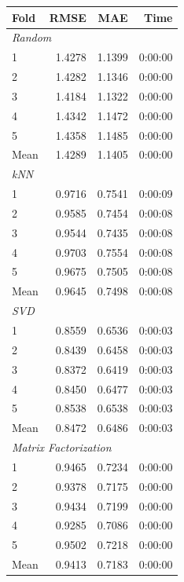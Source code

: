 {\small
\renewcommand{\arraystretch}{0.85}
\setlength{\tabcolsep}{4pt}
\begin{table}[H]
  \centering
  \begin{tabular}{lrrr}
    \hline
    \textbf{Fold} & \textbf{RMSE} & \textbf{MAE} & \textbf{Time} \\
    \hline
    \multicolumn{4}{l}{\textit{Random}} \\
    1    & 1.4278 & 1.1399 & 0:00:00 \\
    2    & 1.4282 & 1.1346 & 0:00:00 \\
    3    & 1.4184 & 1.1322 & 0:00:00 \\
    4    & 1.4342 & 1.1472 & 0:00:00 \\
    5    & 1.4358 & 1.1485 & 0:00:00 \\
    Mean & 1.4289 & 1.1405 & 0:00:00 \\
    \hline
    \multicolumn{4}{l}{\textit{kNN}} \\
    1    & 0.9716 & 0.7541 & 0:00:09 \\
    2    & 0.9585 & 0.7454 & 0:00:08 \\
    3    & 0.9544 & 0.7435 & 0:00:08 \\
    4    & 0.9703 & 0.7554 & 0:00:08 \\
    5    & 0.9675 & 0.7505 & 0:00:08 \\
    Mean & 0.9645 & 0.7498 & 0:00:08 \\
    \hline
    \multicolumn{4}{l}{\textit{SVD}} \\
    1    & 0.8559 & 0.6536 & 0:00:03 \\
    2    & 0.8439 & 0.6458 & 0:00:03 \\
    3    & 0.8372 & 0.6419 & 0:00:03 \\
    4    & 0.8450 & 0.6477 & 0:00:03 \\
    5    & 0.8538 & 0.6538 & 0:00:03 \\
    Mean & 0.8472 & 0.6486 & 0:00:03 \\
    \hline
    \multicolumn{4}{l}{\textit{Matrix Factorization}} \\
    1    & 0.9465 & 0.7234 & 0:00:00 \\
    2    & 0.9378 & 0.7175 & 0:00:00 \\
    3    & 0.9434 & 0.7199 & 0:00:00 \\
    4    & 0.9285 & 0.7086 & 0:00:00 \\
    5    & 0.9502 & 0.7218 & 0:00:00 \\
    Mean & 0.9413 & 0.7183 & 0:00:00 \\

\end{tabular}
\end{table}}
